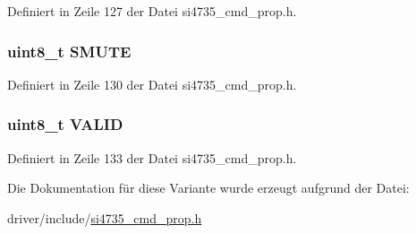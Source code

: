 Definiert in Zeile 127 der Datei si4735\+\_\+cmd\+\_\+prop.\+h.

\hypertarget{unionfm__rsq__status__resp2_a6f4b6956b747e720f4c2eb97e84be9df}{}
\subsubsection[{S\+M\+U\+T\+E}]{\setlength{\rightskip}{0pt plus 5cm}uint8\+\_\+t S\+M\+U\+T\+E}\label{unionfm__rsq__status__resp2_a6f4b6956b747e720f4c2eb97e84be9df}


Definiert in Zeile 130 der Datei si4735\+\_\+cmd\+\_\+prop.\+h.

\hypertarget{unionfm__rsq__status__resp2_a58bd81dc31c117b187f38fbc118b393e}{}
\subsubsection[{V\+A\+L\+I\+D}]{\setlength{\rightskip}{0pt plus 5cm}uint8\+\_\+t V\+A\+L\+I\+D}\label{unionfm__rsq__status__resp2_a58bd81dc31c117b187f38fbc118b393e}


Definiert in Zeile 133 der Datei si4735\+\_\+cmd\+\_\+prop.\+h.



Die Dokumentation für diese Variante wurde erzeugt aufgrund der Datei\+:\begin{DoxyCompactItemize}
\item 
driver/include/\hyperlink{si4735__cmd__prop_8h}{si4735\+\_\+cmd\+\_\+prop.\+h}\end{DoxyCompactItemize}
